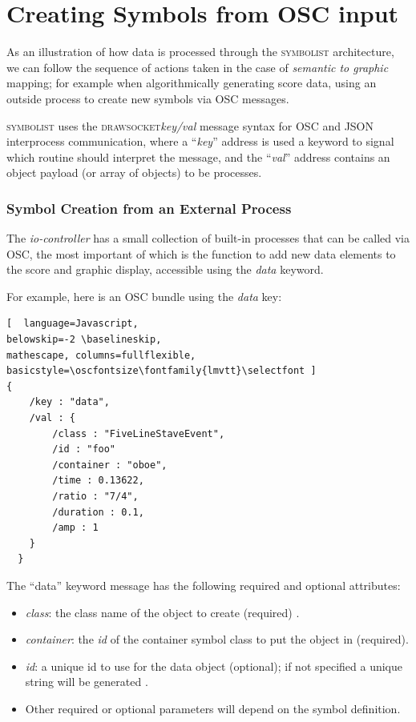 \documentclass{article}
\def\symbolist{\textsc{symbolist}\xspace}
\def\drawsocket{\textsc{drawsocket}\xspace}
\def\iocontroller{\textit{io-controller}\xspace}
\def\oscfontsize{\tiny}
\begin{document}
\section{Creating Symbols from OSC input}\label{sec:osc_input}

As an illustration of how data is processed through the \symbolist architecture, we can follow the sequence of actions taken in the case of \textit{semantic to graphic} mapping; for example when algorithmically generating score data, using an outside process to create new symbols via OSC messages.

\symbolist uses the \drawsocket \textit{key/val} message syntax for OSC and JSON interprocess communication, where a ``\textit{key}'' address is used a keyword to signal which routine should interpret the message, and the ``\textit{val}'' address contains an object payload (or array of objects) to be processes.

\subsubsection*{Symbol Creation from an External Process}


The \iocontroller has a small collection of built-in processes that can be called via OSC, the most important of which is the function to add new data elements to the score and graphic display, accessible using the \textit{data} keyword.

For example, here is an OSC bundle using the \textit{data} key:
\begin{lstlisting}[  language=Javascript, 
belowskip=-2 \baselineskip,
mathescape, columns=fullflexible, basicstyle=\oscfontsize\fontfamily{lmvtt}\selectfont ]
{
    /key : "data",
    /val : {
        /class : "FiveLineStaveEvent",
        /id : "foo"
        /container : "oboe",
        /time : 0.13622,
        /ratio : "7/4",
        /duration : 0.1,
        /amp : 1
    }
  }
\end{lstlisting}

The ``data'' keyword message has the following required and optional attributes:
\begin{itemize}\itemsep0pt 
  \item \textit{class}: the class name of the object to create (required) .
  \item \textit{container}: the \textit{id} of the container symbol class to put the object in (required).
   \item \textit{id}: a unique id to use for the data object (optional); if not specified a unique string will be generated .
  \item Other required or optional parameters will depend on the symbol definition.
\end{itemize}
\end{document}
